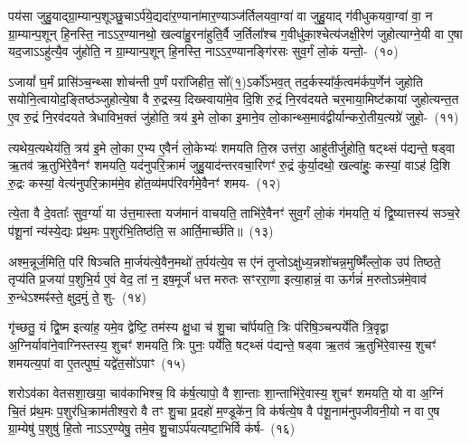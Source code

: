 पय॑सा जुहु॒याद्ग्रा॒म्यान्प॒शूञ्छु॒चा\-ऽर्प॑ये॒द्यदा॑र॒ण्याना॑मार॒ण्याञ्ज॑र्तिलयवा॒ग्वा॑ वा जुहु॒याद् ग॑वीधुकयवा॒ग्वा॑ वा॒ न ग्रा॒म्यान्प॒शून् हि॒नस्ति॒ ना\-ऽऽर॒ण्यानथो॒ खल्वा॑हु॒रना॑हुति॒र्वै ज॒र्तिला᳚श्च ग॒वीधु॑का॒श्चेत्य॑जक्षी॒रेण॑ जुहोत्याग्ने॒यी वा ए॒षा यद॒जा\-ऽऽ\-हु॑त्यै॒व जु॑होति॒ न ग्रा॒म्यान्प॒शून् हि॒नस्ति॒ ना\-ऽऽ\-र॒ण्यानङ्गि॑रसः सुव॒र्गं लो॒कं यन्तो॒-~(१०)\ip

ऽजायां᳚ घ॒र्मं प्रासि॑ञ्च॒न्थ्सा शोच॑न्ती प॒र्णं परा॑जिहीत॒ सो᳚(१॒)\-ऽर्को॑\-ऽभव॒त् तद॒र्कस्या᳚र्क॒त्वम॑र्क\-प॒र्णेन॑ जुहोति सयोनि॒त्वायोद॒ङ्तिष्ठ॑ञ्जुहोत्ये॒षा वै रु॒द्रस्य॒ दिख्स्वाया॑मे॒व दि॒शि रु॒द्रं नि॒रव॑दयते चर॒माया॒मिष्ट॑कायां जुहोत्यन्त॒त ए॒व रु॒द्रं नि॒रव॑दयते त्रेधाविभ॒क्तं जु॑होति॒ त्रय॑ इ॒मे लो॒का इ॒माने॒व लो॒कान्थ्स॒माव॑द्वीर्यान्करो॒तीय॒त्यग्रे॑ जुहो॒-~(११)\ip

त्यथेय॒त्यथेय॑ति॒ त्रय॑ इ॒मे लो॒का ए॒भ्य ए॒वैनं॑ लो॒केभ्यः॑ शमयति ति॒स्र उत्त॑रा॒ आहु॑तीर्जुहोति॒ षट्थ्सं प॑द्यन्ते॒ षड्वा ऋ॒तव॑ ऋ॒तुभि॑रे॒वैनꣳ॑ शमयति॒ यद॑नुपरि॒क्रामं॑ जुहु॒याद॑न्तरवचा॒रिणꣳ॑ रु॒द्रं कु॑र्या॒दथो॒ खल्वा॑हुः॒ कस्यां॒ वाऽह॑ दि॒शि रु॒द्रः कस्यां॒ वेत्य॑नुपरि॒क्राम॑मे॒व हो॑त॒व्य॑मप॑रिवर्गमे॒वैनꣳ॑ शमय-~(१२)\ip

त्ये॒ता वै दे॒वताः᳚ सुव॒र्ग्या॑ या उ॑त्त॒मास्ता यज॑मानं वाचयति॒ ताभि॑रे॒वैनꣳ॑ सुव॒र्गं लो॒कं ग॑मयति॒ यं द्वि॒ष्यात्तस्य॑ सञ्च॒रे प॑शू॒नां न्य॑स्ये॒द्यः प्र॑थ॒मः प॒शुर॑भि॒तिष्ठ॑ति॒ स आर्ति॒मार्च्छ॑ति॥~(१३)\ip

{\anuvakamend[{प॒शू॒नां यन्तो\-ऽग्रे॑ जुहो॒त्यप॑रिवर्गमे॒वैनꣳ॑ शमयति त्रि॒ꣳ॒शच्च॑}]}

अश्म॒न्नूर्ज॒मिति॒ परि॑ षिञ्चति मा॒र्जय॑त्ये॒वैन॒मथो॑ त॒र्पय॑त्ये॒व स ए॑नं तृ॒प्तो\-ऽक्षु॑ध्य॒न्नशो॑चन्न॒मुष्मिँ॑ल्लो॒क उप॑ तिष्ठते॒ तृप्य॑ति प्र॒जया॑ प॒शुभि॒र्य ए॒वं वेद॒ तां न॒ इष॒मूर्जं॑ धत्त मरुतः सꣳररा॒णा इत्या॒हान्नं॒ वा ऊर्गन्नं॑ म॒रुतो\-ऽन्न॑मे॒वाव॑ रु॒न्धे\-ऽश्मꣴ॑स्ते॒ क्षुद॒मुं ते॒ शु-~(१४)\ip

गृ॑च्छतु॒ यं द्वि॒ष्म इत्या॑ह॒ यमे॒व द्वेष्टि॒ तम॑स्य क्षु॒धा च॑ शु॒चा चा᳚र्पयति॒ त्रिः प॑रिषि॒ञ्चन्पर्ये॑ति त्रि॒वृद्वा अ॒ग्निर्यावा॑ने॒वाग्निस्तस्य॒ शुचꣳ॑ शमयति॒ त्रिः पुनः॒ पर्ये॑ति॒ षट्थ्सं प॑द्यन्ते॒ षड्वा ऋ॒तव॑ ऋ॒तुभि॑रे॒वास्य॒ शुचꣳ॑ शमयत्य॒पां वा ए॒तत्पुष्पं॒ यद्वे॑त॒सो॑\-ऽपाꣳ~(१५)\ip

शरो\-ऽव॑का वेतसशा॒खया॒ चाव॑काभिश्च॒ वि क॑र्\mbox{}ष॒त्यापो॒ वै शा॒न्ताः शा॒न्ताभि॑रे॒वास्य॒ शुचꣳ॑ शमयति॒ यो वा अ॒ग्निं चि॒तं प्र॑थ॒मः प॒शुर॑धि॒क्राम॑तीश्व॒रो वै तꣳ शु॒चा प्र॒दहो॑ म॒ण्डूके॑न॒ वि क॑र्\mbox{}षत्ये॒ष वै प॑शू॒नाम॑नुपजीवनी॒यो न वा ए॒ष ग्रा॒म्येषु॑ प॒शुषु॑ हि॒तो ना\-ऽऽर॒ण्येषु॒ तमे॒व शु॒चा\-ऽर्प॑यत्यष्टा॒भिर्वि क॑र्\mbox{}ष-~(१६)\ip

